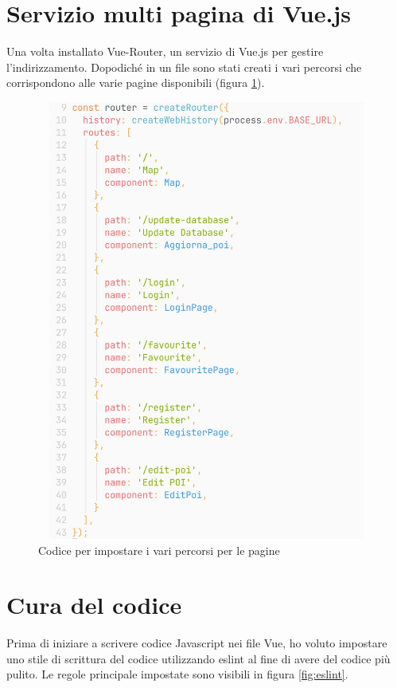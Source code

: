 \section{Servizio multi pagina di Vue.js}
Una volta installato Vue-Router, un servizio di Vue.js per gestire l'indirizzamento. Dopodiché in un file sono stati creati i vari percorsi che corrispondono alle varie pagine disponibili (figura \ref{fig:route}).

\begin{figure}[h]
\begin{center}                      
\includegraphics[width=12cm, height=14.5cm]{images/route.jpg}
\caption[Codice per impostare i vari percorsi per le pagine]{Codice per impostare i vari percorsi per le pagine}\label{fig:route}
\end{center}
\end{figure}

\section{Cura del codice}
Prima di iniziare a scrivere codice Javascript nei file Vue, ho voluto impostare uno stile di scrittura del codice utilizzando eslint al fine di avere del codice più pulito. Le regole principale impostate sono visibili in figura \ref{fig:eslint}.


